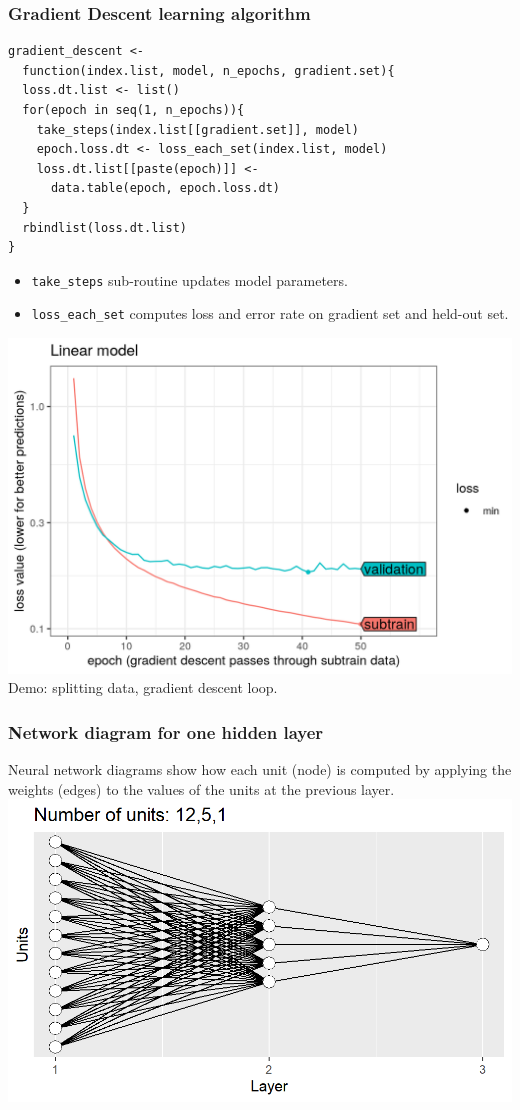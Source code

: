 \documentclass{beamer}
\begin{document}
\begin{frame}[fragile]
  \frametitle{Gradient Descent learning algorithm}
\begin{verbatim}
gradient_descent <- 
  function(index.list, model, n_epochs, gradient.set){
  loss.dt.list <- list()
  for(epoch in seq(1, n_epochs)){
    take_steps(index.list[[gradient.set]], model)
    epoch.loss.dt <- loss_each_set(index.list, model)
    loss.dt.list[[paste(epoch)]] <- 
      data.table(epoch, epoch.loss.dt)
  }
  rbindlist(loss.dt.list)
}
\end{verbatim}
  \begin{itemize}
  \item \verb|take_steps| sub-routine updates model parameters.
  \item \verb|loss_each_set| computes loss and error rate on gradient set
    and held-out set.
  \end{itemize}
\end{frame}
 
\begin{frame}
  \includegraphics[width=\textwidth]{figure-validation-loss-linear}
  Demo: splitting data, gradient descent loop.
\end{frame}

\begin{frame}
  \frametitle{Network diagram for one hidden layer}
  Neural network
  diagrams show how each unit (node) is computed by applying the
  weights (edges) to the values of the units at the previous layer.
\includegraphics[width=\textwidth]{figure-architecture-oneOut}
\end{frame}
 
\end{document}
